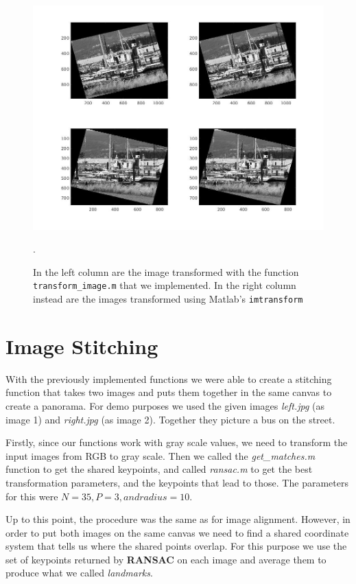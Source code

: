 \documentclass[11pt]{article}
\begin{document}
\begin{figure}[htpb]
	\centering
	\includegraphics[width=1\textwidth]{imgs/imtransform_vs_custom.jpg}
	\caption{In the left column are the image transformed with the function
		\texttt{transform\_image.m} that we implemented. In the right
		column instead are the images transformed using Matlab's
		\texttt{imtransform}}.
	\label{fig:imtransform_vs_custom}
\end{figure}



\section{Image Stitching}
With the previously implemented functions we were able to create a stitching function that takes two images and puts them together in the same canvas to create a panorama. For demo purposes we used the given images \textit{left.jpg} (as image 1) and \textit{right.jpg} (as image 2). Together they picture a bus on the street. 
 
Firstly, since our functions work with gray scale values, we need to transform the input images from RGB to gray scale. Then we called the \textit{get\_matches.m} function to get the shared keypoints, and called \textit{ransac.m} to get the best transformation parameters, and the keypoints that lead to those. The parameters for this were $N = 35, P = 3, and radius = 10$.

Up to this point, the procedure was the same as for image alignment. However, in order to put both images on the same canvas we need to find a shared coordinate system that tells us where the shared points overlap. For this purpose we use the set of keypoints returned by \textbf{RANSAC} on each image and average them to produce what we called \textit{landmarks}.
\end{document}
